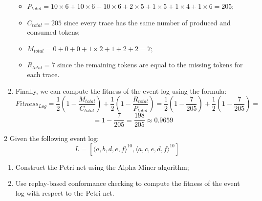 \begin{enumerate}
    \begin{itemize}
        \item $P_{total} = 10 \times 6 + 10 \times 6 + 10\times 6 + 2\times 5 + 1\times 5 + 1\times 4 + 1\times 6 = 205$;
        \item $C_{total} = 205$ since every trace has the same number of produced and consumed tokens;
        \item $M_{total} = 0 + 0 + 0 + 1 \times 2 + 1 + 2 + 2 = 7$;
        \item $R_{total} = 7$ since the remaining tokens are equal to the missing tokens for each trace.
    \end{itemize}
    \item Finally, we can compute the fitness of the event log using the formula:
    \[Fitness_{Log} = \frac{1}{2} (1 - \frac{M_{total}}{C_{total}}) + \frac{1}{2} (1 - \frac{R_{total}}{P_{total}}) = \frac{1}{2} (1 - \frac{7}{205}) + \frac{1}{2} (1 - \frac{7}{205}) = \]
    \[ = 1 - \frac{7}{205} = \frac{198}{205} \approx 0.9659\]
\end{enumerate}

\begin{exercise}{2}
Given the following event log:
\[L = [\langle a,b,d,e,f \rangle^{10}, \langle a,c,e,d,f \rangle^{10} ]\]
\begin{enumerate}
    \item Construct the Petri net using the Alpha Miner algorithm;
    \item Use replay-based conformance checking to compute the fitness of the event log with respect to the Petri net.
\end{enumerate}
\end{exercise}
